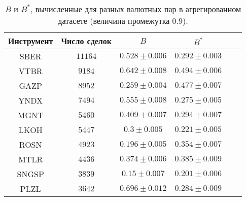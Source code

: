 \begin{table}[h!]
    \begin{center}
        \begin{tabular}{|c|c|c|c|c|c|}
            \hline
            Инструмент & Число сделок & $B$               & $B ^*$            \\ \hline
            SBER & $11164$ & $0.528 \pm 0.006$ & $0.292 \pm 0.003$ \\ \hline
            VTBR       & $9184$       & $0.642 \pm 0.008$ & $0.494 \pm 0.006$ \\ \hline
            GAZP       & $8952$       & $0.259 \pm 0.004$ & $0.477 \pm 0.007$ \\ \hline
            YNDX       & $7494$       & $0.555 \pm 0.008$ & $0.275 \pm 0.005$ \\ \hline
            MGNT       & $5460$       & $0.409 \pm 0.007$ & $0.294 \pm 0.007$ \\ \hline
            LKOH       & $5447$       & $0.3 \pm 0.005$   & $0.221 \pm 0.005$ \\ \hline
            ROSN       & $4923$       & $0.196 \pm 0.005$ & $0.354 \pm 0.007$ \\ \hline
            MTLR       & $4436$       & $0.374 \pm 0.006$ & $0.385 \pm 0.009$ \\ \hline
            SNGSP      & $3839$       & $0.15 \pm 0.007$  & $0.201 \pm 0.006$ \\ \hline
            PLZL       & $3642$       & $0.696 \pm 0.012$ & $0.284 \pm 0.009$ \\ \hline
        \end{tabular}
    \end{center}\caption{$B$ и $B ^*$, вычисленные для разных валютных пар в агрегированном датасете (величина промежутка 0.9).}
    \label{Aggreg1CU0.9} \end{table}

